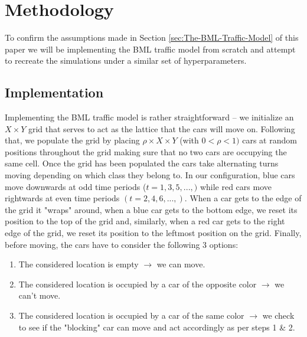 \section{Methodology}
\label{sec:Methodology}
To confirm the assumptions made in Section \ref{sec:The-BML-Traffic-Model} of this paper we will be implementing the BML traffic model from scratch and attempt to recreate the simulations under a similar set of hyperparameters.

\subsection{Implementation}
\label{subsec:Methodology:Implementation}
Implementing the BML traffic model is rather straightforward -- we initialize an $X \times Y$ grid that serves to act as the lattice that the cars will move on. Following that, we populate the grid by placing $\rho \times X \times Y$ (with $0 < \rho < 1)$ cars at random positions throughout the grid making sure that no two cars are occupying the same cell. Once the grid has been populated the cars take alternating turns moving depending on which class they belong to. In our configuration, blue cars move downwards at odd time periods ($t = 1, 3, 5, ...,)$ while red cars move rightwards at even time periods $(t = 2, 4, 6, ...,)$. When a car gets to the edge of the grid it "wraps" around, \eg when a blue car gets to the bottom edge, we reset its position to the top of the grid and, similarly, when a red car gets to the right edge of the grid, we reset its position to the leftmost position on the grid. Finally, before moving, the cars have to consider the following 3 options:

\begin{enumerate}
    \item The considered location is empty $\rightarrow$ we can move.
    \item The considered location is occupied by a car of the opposite color $\rightarrow$ we can't move.
    \item The considered location is occupied by a car of the same color $\rightarrow$ we check to see if the "blocking" car can move and act accordingly as per steps 1 \& 2.
\end{enumerate}

